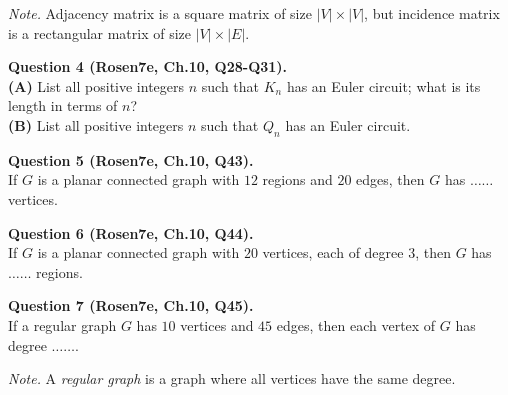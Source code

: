 \documentclass[jou]{apa6}
\begin{document}
{\em Note.} Adjacency matrix is a square matrix of size $|V| \times |V|$, 
but incidence matrix is a rectangular matrix of size $|V| \times |E|$.

\vspace{10pt}
{\bf Question 4 (Rosen7e, Ch.10, Q28-Q31).}\\
{\bf (A)} List all positive integers $n$ such that $K_n$ has an Euler circuit; 
what is its length in terms of $n$?\\
{\bf (B)} List all positive integers $n$ such that $Q_n$ has an Euler circuit.



\vspace{10pt}
{\bf Question 5 (Rosen7e, Ch.10, Q43).}\\
If $G$ is a planar connected graph with $12$ regions and $20$ edges, then $G$ has $\ldots\ldots$ vertices.


\vspace{10pt}
{\bf Question 6 (Rosen7e, Ch.10, Q44).}\\
If $G$ is a planar connected graph with $20$ vertices, each of degree $3$, then $G$ has $\ldots\ldots$ regions.

\vspace{10pt}
{\bf Question 7 (Rosen7e, Ch.10, Q45).}\\
If a regular graph $G$ has $10$ vertices and $45$ edges, then each vertex of $G$ has degree $\ldots\ldots$.

{\em Note.} A {\em regular graph} is a graph where all vertices have the same degree.
\end{document}
